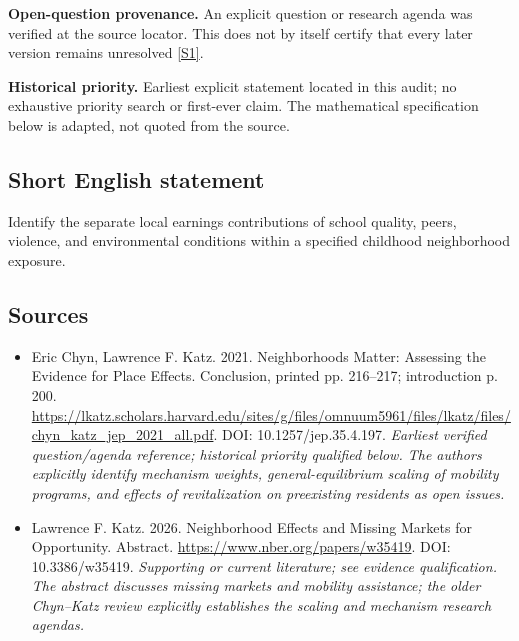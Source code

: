 \documentclass[11pt]{article}
\newcommand{\sref}[2]{\hyperlink{source:#1:#2}{[S#2]}}
\begin{document}
\par\textbf{Open-question provenance.} An explicit question or research agenda was verified at the source locator. This does not by itself certify that every later version remains unresolved \sref{30007748}{1}.

\par\textbf{Historical priority.} Earliest explicit statement located in this audit; no exhaustive priority search or first-ever claim. The mathematical specification below is adapted, not quoted from the source.

\subsection{Short English statement}
Identify the separate local earnings contributions of school quality, peers, violence, and environmental conditions within a specified childhood neighborhood exposure.

\subsection{Sources}
\begin{itemize}\raggedright
\item[\textnormal{[S1]}]\hypertarget{source:30007748:1}{} Eric Chyn, Lawrence F. Katz. 2021. Neighborhoods Matter: Assessing the Evidence for Place Effects. Conclusion, printed pp. 216–217; introduction p. 200.
\url{https://lkatz.scholars.harvard.edu/sites/g/files/omnuum5961/files/lkatz/files/chyn_katz_jep_2021_all.pdf}.
DOI: 10.1257/jep.35.4.197.
{\small\textit{Earliest verified question/agenda reference; historical priority qualified below. The authors explicitly identify mechanism weights, general-equilibrium scaling of mobility programs, and effects of revitalization on preexisting residents as open issues.}}

\item[\textnormal{[S2]}]\hypertarget{source:30007748:2}{} Lawrence F. Katz. 2026. Neighborhood Effects and Missing Markets for Opportunity. Abstract.
\url{https://www.nber.org/papers/w35419}.
DOI: 10.3386/w35419.
{\small\textit{Supporting or current literature; see evidence qualification. The abstract discusses missing markets and mobility assistance; the older Chyn–Katz review explicitly establishes the scaling and mechanism research agendas.}}
\end{itemize}
\end{document}
